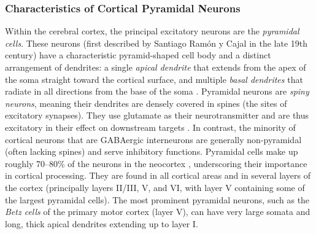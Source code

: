 \documentclass[final, a4paper,masters,en,listoffigures,listoftables,norwegiandates]{NMBU}
\begin{document}
\subsubsection{Characteristics of Cortical Pyramidal Neurons}
Within the cerebral cortex, the principal excitatory neurons are the \textit{pyramidal cells}. These neurons (first described by Santiago Ramón y Cajal in the late 19th century) have a characteristic pyramid-shaped cell body and a distinct arrangement of dendrites: a single \textit{apical dendrite} that extends from the apex of the soma straight toward the cortical surface, and multiple \textit{basal dendrites} that radiate in all directions from the base of the soma \cite{Spruston2008}. Pyramidal neurons are \textit{spiny neurons}, meaning their dendrites are densely covered in spines (the sites of excitatory synapses). They use glutamate as their neurotransmitter and are thus excitatory in their effect on downstream targets \cite{Bear2015}. In contrast, the minority of cortical neurons that are GABAergic interneurons are generally non-pyramidal (often lacking spines) and serve inhibitory functions. Pyramidal cells make up roughly 70–80\% of the neurons in the neocortex \cite{Harris2015}, underscoring their importance in cortical processing. They are found in all cortical areas and in several layers of the cortex (principally layers II/III, V, and VI, with layer V containing some of the largest pyramidal cells). The most prominent pyramidal neurons, such as the \textit{Betz cells} of the primary motor cortex (layer V), can have very large somata and long, thick apical dendrites extending up to layer I.
\end{document}
